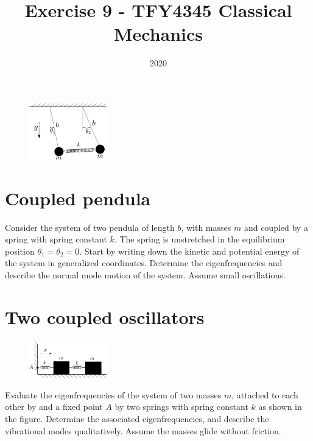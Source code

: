 \documentclass{article}
\title{Exercise 9 - TFY4345 Classical Mechanics}
\date{2020}
\begin{document}
    \maketitle
    \begin{figure}
        \vspace{-0.5cm}
        \includegraphics[width=0.3\textwidth]{figures/figure_1.pdf}
        \vspace*{-2.1cm}
    \end{figure}
    \section{Coupled pendula}
    Consider the system of two pendula of length $b$, with masses $m$ and coupled by a spring with spring constant $k$. The spring is unstretched in the equilibrium position $\theta_1 = \theta_2 = 0$. Start by writing down the kinetic and potential energy of the system in generalized coordinates. Determine the eigenfrequencies and describe the normal mode motion of the system. Assume small oscillations.

    \section{Two coupled oscillators}
    \begin{figure}
        \vspace{-0.5cm}
        \includegraphics[width=0.3\textwidth]{figures/figure_2.pdf}
        \vspace*{-1cm}
    \end{figure}
    Evaluate the eigenfrequencies of the system of two masses $m$, attached to each other by and a fixed point $A$ by two springs with spring constant $k$ as shown in the figure. Determine the associated eigenfrequencies, and describe the vibrational modes qualitatively. Assume the masses glide without friction.
\end{document}
